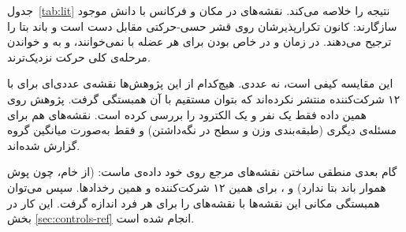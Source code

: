 جدول~\ref{tab:lit} نتیجه را خلاصه می‌کند. نقشه‌های  در مکان و فرکانس با دانش موجود سازگارند: کانون تکرارپذیرشان روی قشر حسی-حرکتی مقابل دست است و باند بتا را ترجیح می‌دهند. در زمان و در خاص بودن برای هر عضله با  نمی‌خوانند، و به  و خواندن مرحله‌ی کلی حرکت نزدیک‌ترند.

این مقایسه کیفی است، نه عددی. هیچ‌کدام از این پژوهش‌ها نقشه‌ی عددی‌ای برای  با ۱۲ شرکت‌کننده منتشر نکرده‌اند که بتوان مستقیم با آن همبستگی گرفت. پژوهش  روی همین داده \cite{cisotto2018} فقط یک نفر و یک الکترود را بررسی کرده است. نقشه‌های  \cite{pintoneto2026} هم برای مسئله‌ی دیگری (طبقه‌بندی وزن و سطح در نگه‌داشتن) و فقط به‌صورت میانگین گروه گزارش شده‌اند.

گام بعدی منطقی ساختن نقشه‌های مرجع روی خود داده‌ی ماست:  (از  خام، چون پوش هموار باند بتا ندارد) و ، برای همین ۱۲ شرکت‌کننده و همین رخدادها. سپس می‌توان همبستگی مکانی این نقشه‌ها با نقشه‌های  را برای هر فرد اندازه گرفت. این کار در بخش \ref{sec:controls-ref} انجام شده است.
